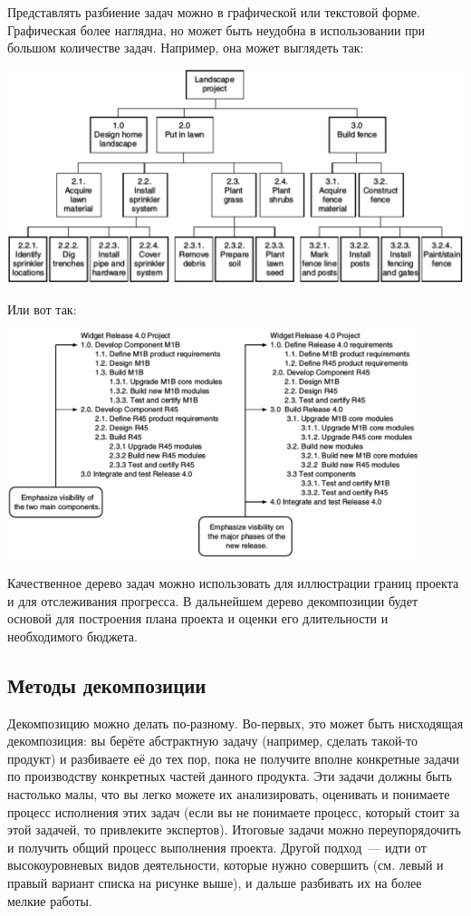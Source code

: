 \documentclass{../../text-style}
\begin{document}
Представлять разбиение задач можно в графической или текстовой форме. Графическая более наглядна, но может быть неудобна в использовании при большом количестве задач. Например, она может выглядеть так:

\begin{center}
    \includegraphics[width=\textwidth]{wbsExample.png}
\end{center}

Или вот так:

\begin{center}
    \includegraphics[width=0.9\textwidth]{wbsExample2.png}
\end{center}

Качественное дерево задач можно использовать для иллюстрации границ проекта и для отслеживания прогресса. В дальнейшем дерево декомпозиции будет основой для построения плана проекта и оценки его длительности и необходимого бюджета.

\subsection{Методы декомпозиции}

Декомпозицию можно делать по-разному. Во-первых, это может быть нисходящая декомпозиция: вы берёте абстрактную задачу (например, сделать такой-то продукт) и разбиваете её до тех пор, пока не получите вполне конкретные задачи по производству конкретных частей данного продукта. Эти задачи должны быть настолько малы, что вы легко можете их анализировать, оценивать и понимаете процесс исполнения этих задач (если вы не понимаете процесс, который стоит за этой задачей, то привлеките экспертов). Итоговые задачи можно переупорядочить и получить общий процесс выполнения проекта. Другой подход~--- идти от высокоуровневых видов деятельности, которые нужно совершить (см. левый и правый вариант списка на рисунке выше), и дальше разбивать их на более мелкие работы.
\end{document}
